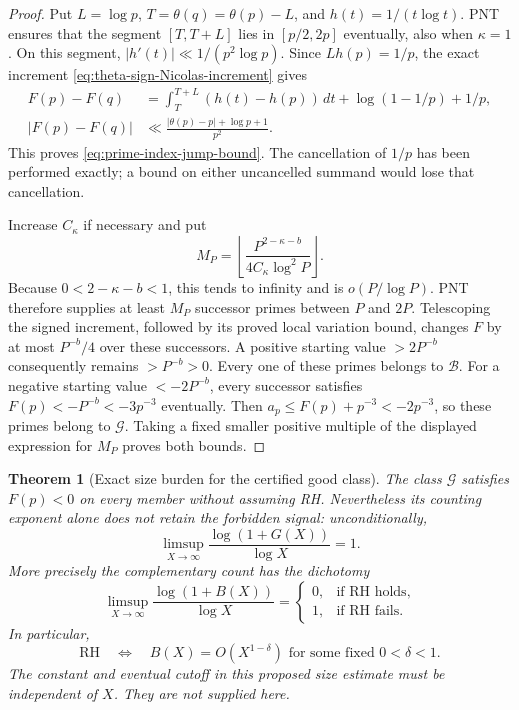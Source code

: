 \documentclass[11pt]{article}
\newtheorem{theorem}{Theorem}[section]
\theoremstyle{definition}
\begin{document}
\begin{proof}
Put $L=\log p$, $T=\theta(q)=\theta(p)-L$, and
$h(t)=1/(t\log t)$. PNT ensures that the segment
$[T,T+L]$ lies in $[p/2,2p]$ eventually, also when $\kappa=1$.
On this segment,
$|h'(t)|\ll1/(p^2\log p)$.
Since $Lh(p)=1/p$, the exact increment
\eqref{eq:theta-sign-Nicolas-increment} gives
\[
 \begin{split}
 F(p)-F(q)
 &=\int_T^{T+L}(h(t)-h(p))\,dt
                           +\log(1-1/p)+1/p,\\
 |F(p)-F(q)|
 &\ll\frac{|\theta(p)-p|+\log p+1}{p^2}.
 \end{split}
\]
This proves \eqref{eq:prime-index-jump-bound}.
The cancellation of $1/p$ has been performed exactly;
a bound on either uncancelled summand would lose that cancellation.

Increase $C_\kappa$ if necessary and put
\[
 M_P=\left\lfloor
       \frac{P^{2-\kappa-b}}{4C_\kappa\log^2P}
      \right\rfloor .
\]
Because $0<2-\kappa-b<1$, this tends to infinity and is
$o(P/\log P)$. PNT therefore supplies at least $M_P$
successor primes between $P$ and $2P$.
Telescoping the signed increment, followed by its proved
local variation bound, changes $F$ by at most $P^{-b}/4$
over these successors.
A positive starting value $>2P^{-b}$ consequently remains
$>P^{-b}>0$. Every one of these primes belongs to $\mathcal B$.
For a negative starting value $<-2P^{-b}$, every successor
satisfies $F(p)<-P^{-b}<-3p^{-3}$ eventually.
Then $a_p\le F(p)+p^{-3}<-2p^{-3}$, so these primes
belong to $\mathcal G$. Taking a fixed smaller positive
multiple of the displayed expression for $M_P$ proves both bounds.
\end{proof}

\begin{theorem}[Exact size burden for the certified good class]
\label{thm:certified-good-prime-size}
The class $\mathcal G$ satisfies $F(p)<0$ on every member
without assuming RH. Nevertheless its counting exponent alone
does not retain the forbidden signal: unconditionally,
\[
        \limsup_{X\to\infty}
           \frac{\log(1+G(X))}{\log X}=1.
\]
More precisely the complementary count has the dichotomy
\begin{equation}
 \limsup_{X\to\infty}\frac{\log(1+B(X))}{\log X}
 =
 \begin{cases}
 0,&\text{if RH holds},\\
 1,&\text{if RH fails}.
 \end{cases}
 \label{eq:certified-good-prime-dichotomy}
\end{equation}
In particular,
\begin{equation}
 \mathrm{RH}
 \quad\Longleftrightarrow\quad
 B(X)=O(X^{1-\delta})\text{ for some fixed }0<\delta<1 .
 \label{eq:certified-good-prime-RH-size}
\end{equation}
The constant and eventual cutoff in this proposed size estimate
must be independent of $X$. They are not supplied here.
\end{theorem}
\end{document}
